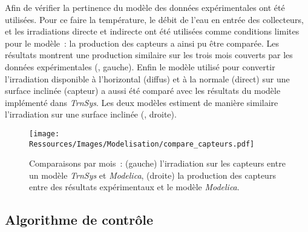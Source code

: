 Afin de vérifier la pertinence du modèle des données expérimentales ont été utilisées.
Pour ce faire la température, le débit de l’eau en entrée des collecteurs, et les
irradiations directe et indirecte ont été utilisées comme conditions limites pour le
modèle~: la production des capteurs a ainsi pu être comparée. Les résultats montrent une
production similaire sur les trois mois couverts par les données expérimentales
(, gauche). Enfin le modèle utilisé pour convertir
l’irradiation disponible à l’horizontal (diffus) et à la normale (direct) sur une surface
inclinée (capteur) a aussi été comparé avec les résultats du modèle implémenté dans
\textit{TrnSys}. Les deux modèles estiment de manière similaire l’irradiation sur une
surface inclinée (, droite).

\begin{figure}
    \centering
    \texttt{[image: Ressources/Images/Modelisation/compare\_capteurs.pdf]}
    \caption[Comparaisons de l’irradiation entre \textit{TrnSys}, \textit{Modelica}]
             {Comparaisons par mois~: (gauche) l’irradiation sur les capteurs entre un modèle
             \textit{TrnSys} et \textit{Modelica}, (droite) la production des capteurs entre des résultats
             expérimentaux et le modèle \textit{Modelica}.
             \label{fig:compare_capteurs}}
\end{figure}


\subsection{Algorithme de contrôle} %
\label{sub:algorithme_de_controle}
